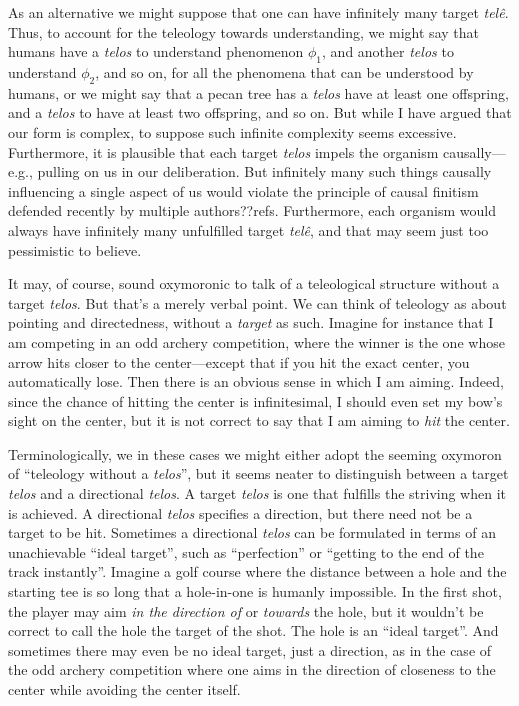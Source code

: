 As an alternative we might suppose that one can have infinitely many target \textit{tel\^e}. Thus, to account
for the teleology towards understanding, we might say that humans have a \textit{telos} to understand
phenomenon $\phi_1$, and another \textit{telos} to understand $\phi_2$, and so on, for all the phenomena that can be understood by humans, or we might say that a pecan tree has a \textit{telos} have
at least one offspring, and a \textit{telos} to have at least two offspring, and so on. But while I have argued that our form is 
complex, to suppose such infinite complexity seems excessive. Furthermore, it is plausible that each target \textit{telos} impels the organism
causally---e.g., pulling on us in our deliberation. But infinitely many such things causally influencing a single aspect of us would violate 
the principle of causal finitism defended recently by multiple authors??refs. Furthermore, each organism would always have infinitely 
many unfulfilled target \textit{tel\^e}, and that may seem just too pessimistic to believe.

It may, of course, sound oxymoronic to talk of a teleological structure without a target \textit{telos}. But that's a merely verbal point. We can
think of teleology as about pointing and directedness, without a \textit{target} as such. Imagine for instance that I am competing in an 
odd archery competition, where the winner is the one whose arrow hits closer to the center---except that if you hit the exact center, you
automatically lose. Then there is an obvious sense in which I am aiming. Indeed, since the chance of hitting the center is infinitesimal,
I should even set my bow's sight on the center, but it is not correct to say that I am aiming to \textit{hit} the center. 

Terminologically, we in these cases we might either adopt the seeming oxymoron of ``teleology without a \textit{telos}'', but it seems neater to distinguish between a target \textit{telos} and a directional \textit{telos}. A target \textit{telos} is
one that fulfills the striving when it is achieved. A directional \textit{telos} specifies a direction, but there need
not be a target to be hit. Sometimes a directional \textit{telos} can be formulated in terms of an unachievable 
``ideal target'', such as ``perfection'' or ``getting to the end of the track instantly''.  Imagine a golf course 
where the distance between a hole and the starting tee is so long that  a hole-in-one is humanly impossible. In the
first shot, the player may aim \textit{in the direction of} or \textit{towards} the hole, but it wouldn't be correct
to call the hole the target of the shot. The hole is an ``ideal target''. And sometimes there may even be no ideal target, just a direction, as in the case of the odd archery competition where one aims in the direction of closeness to the 
center while avoiding the center itself. 

